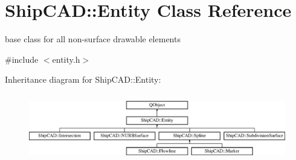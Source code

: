 \hypertarget{classShipCAD_1_1Entity}{}\section{Ship\+C\+AD\+:\+:Entity Class Reference}
\label{classShipCAD_1_1Entity}


base class for all non-\/surface drawable elements  




{\ttfamily \#include $<$entity.\+h$>$}

Inheritance diagram for Ship\+C\+AD\+:\+:Entity\+:\begin{figure}[H]
\begin{center}
\leavevmode
\includegraphics[height=2.978724cm]{classShipCAD_1_1Entity}
\end{center}
\end{figure}
